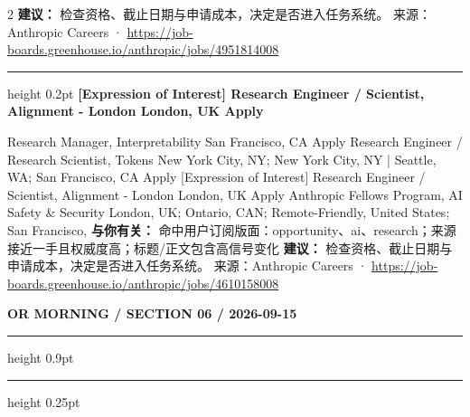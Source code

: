 \documentclass[10.5pt]{ctexart}
\begin{document}
\begin{multicols}{2}
\textbf{建议：} 检查资格、截止日期与申请成本，决定是否进入任务系统。
{\footnotesize\color{ormuted} 来源：Anthropic Careers · \url{https://job-boards.greenhouse.io/anthropic/jobs/4951814008}}
\vspace{2mm}
\hrule height 0.2pt
\vspace{2mm}
{\large\bfseries [Expression of Interest] Research Engineer / Scientist, Alignment - London London, UK Apply}\par
[Expression of Interest] Research Manager, Interpretability San Francisco, CA Apply Research Engineer / Research Scientist, Tokens New York City, NY; New York City, NY | Seattle, WA; San Francisco, CA Apply [Expression of Interest] Research Engineer / Scientist, Alignment - London London, UK Apply Anthropic Fellows Program, AI Safety \& Security London, UK; Ontario, CAN; Remote-Friendly, United States; San Francisco, 
\textbf{与你有关：} 命中用户订阅版面：opportunity、ai、research；来源接近一手且权威度高；标题/正文包含高信号变化
\textbf{建议：} 检查资格、截止日期与申请成本，决定是否进入任务系统。
{\footnotesize\color{ormuted} 来源：Anthropic Careers · \url{https://job-boards.greenhouse.io/anthropic/jobs/4610158008}}
\end{multicols}
\newpage
{\small\bfseries OR MORNING / SECTION 06 / 2026-09-15}
\vspace{2mm}
\hrule height 0.9pt
\vspace{1.5mm}
\hrule height 0.25pt
\vspace{4mm}
\end{document}

